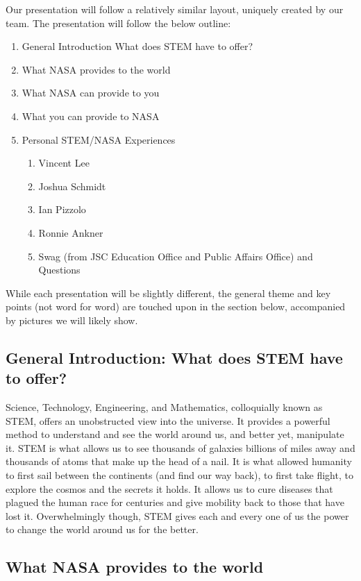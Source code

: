 \documentclass{article}
\let\Oldsubsection\subsection
\renewcommand{\subsection}{\FloatBarrier\Oldsubsection}
\begin{document}
Our presentation will follow a relatively similar layout, uniquely created by our team. The presentation will follow the below outline:

\begin{enumerate}
\item General Introduction What does STEM have to offer?
\item What NASA provides to the world
\item What NASA can provide to you
\item What you can provide to NASA
\item Personal STEM/NASA Experiences
\begin{enumerate}
\item Vincent Lee
\item Joshua Schmidt
\item Ian Pizzolo
\item Ronnie Ankner
\item Swag (from JSC Education Office and Public Affairs Office) and Questions
\end{enumerate}
\end{enumerate}

While each presentation will be slightly different, the general theme and key points (not word for word) are touched upon in the section below, accompanied by pictures we will likely show.

\subsection{General Introduction: What does STEM have to offer?}

Science, Technology, Engineering, and Mathematics, colloquially known as STEM, offers an unobstructed view into the universe. It provides a powerful method to understand and see the world around us, and better yet, manipulate it. STEM is what allows us to see thousands of galaxies billions of miles away and thousands of atoms that make up the head of a nail. It is what allowed humanity to first sail between the continents (and find our way back), to first take flight, to explore the cosmos and the secrets it holds. It allows us to cure diseases that plagued the human race  for centuries and give mobility back to those that have lost it. Overwhelmingly  though, STEM gives each and every one of us the power to change the world around us for the better.

\subsection{What NASA provides to the world}
\end{document}
